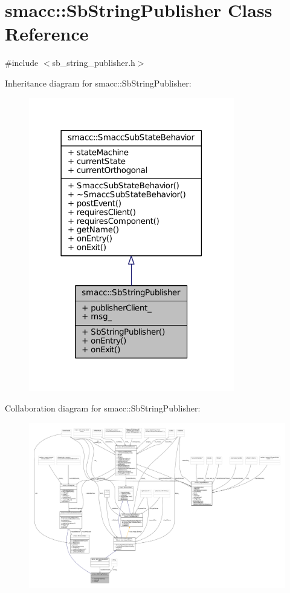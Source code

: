 \hypertarget{classsmacc_1_1SbStringPublisher}{}\section{smacc\+:\+:Sb\+String\+Publisher Class Reference}
\label{classsmacc_1_1SbStringPublisher}


{\ttfamily \#include $<$sb\+\_\+string\+\_\+publisher.\+h$>$}



Inheritance diagram for smacc\+:\+:Sb\+String\+Publisher\+:
\nopagebreak
\begin{figure}[H]
\begin{center}
\leavevmode
\includegraphics[width=254pt]{classsmacc_1_1SbStringPublisher__inherit__graph}
\end{center}
\end{figure}


Collaboration diagram for smacc\+:\+:Sb\+String\+Publisher\+:
\nopagebreak
\begin{figure}[H]
\begin{center}
\leavevmode
\includegraphics[width=350pt]{classsmacc_1_1SbStringPublisher__coll__graph}
\end{center}
\end{figure}

